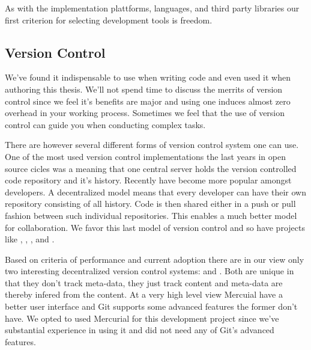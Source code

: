 As with the implementation plattforms, languages, and third party libraries
our first criterion for selecting development tools is freedom.

\subsection{Version Control}

We've found it indispensable to use  when writing code
and even used it when authoring this thesis. We'll not spend time to discuss
the merrits of version control since we feel it's benefits are major and
using one induces almost zero overhead in your working process. Sometimes we
feel that the use of version control can guide you when conducting complex
tasks.

There are however several different forms of version control system one can
use. One of the most used version control implementations the last years
in open source cicles was
%
\dash{}a  meaning that one central
server holds the version controlled code repository and it's history.%
Recently  have become more popular
amongst developers. A decentralized model means that every developer can have
their own repository consisting of all history.%
Code is then shared either in a push or pull fashion between such individual
repositories. This enables a much better model for collaboration.
We favor this last model of version control and so have projects
like , , ,
and .%

Based on criteria of performance and current adoption there are in our view
only two interesting decentralized version control systems:
%
and %
. Both are unique in that they don't track meta-data, they just track
content and meta-data are thereby infered from the content.
At a very high level view Mercuial have a better user interface and Git
supports some advanced features the former don't have. We opted to used
Mercurial for this development project since we've substantial experience in
using it and did not need any of Git's advanced features.


